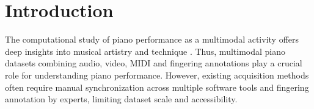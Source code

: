 \documentclass{article}
\begin{document}
\begin{abstract}
\end{abstract}

\section{Introduction}\label{sec:introduction}


The computational study of piano performance as a multimodal activity offers deep insights into musical artistry and technique \cite{jensen2012multimodal, riley2005use, parmar2021piano}. Thus, multimodal piano datasets combining audio, video, MIDI and fingering annotations play a crucial role for understanding piano performance. However, existing acquisition methods often require manual synchronization across multiple software tools and fingering annotation by experts, limiting dataset scale and accessibility.
\end{document}
